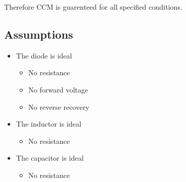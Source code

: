 Therefore CCM is guarenteed for all specified conditions.

\subsection*{Assumptions}

\begin{itemize}
    \item The diode is ideal
    \begin{itemize}
        \item No resistance
        \item No forward voltage
        \item No reverse recovery
    \end{itemize}
    \item The inductor is ideal
    \begin{itemize}
        \item No resistance
    \end{itemize}
    \item The capacitor is ideal
    \begin{itemize}
        \item No resistance
    \end{itemize}
\end{itemize}

